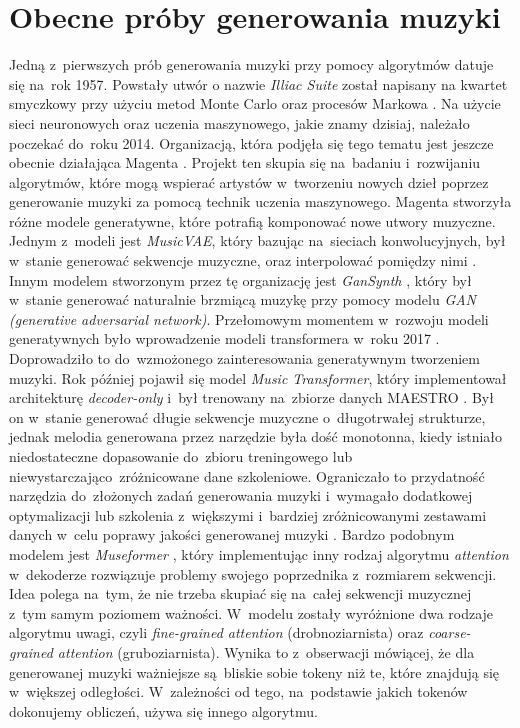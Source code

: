 \documentclass[data-science]{agh-wi} %
\begin{document}
\section{Obecne próby generowania muzyki}
Jedną z~pierwszych prób generowania muzyki przy pomocy algorytmów datuje się na~rok 1957. Powstały utwór o nazwie \textit{Illiac Suite} został napisany na kwartet smyczkowy przy użyciu metod Monte Carlo oraz procesów Markowa \cite*{komuter_gra}. Na użycie sieci neuronowych oraz uczenia maszynowego, jakie znamy dzisiaj, należało poczekać do~roku 2014. Organizacją, która podjęła się tego tematu jest jeszcze obecnie działająca Magenta \cite*{magenta}. Projekt ten skupia się na~badaniu i~rozwijaniu algorytmów, które mogą wspierać artystów w~tworzeniu nowych dzieł poprzez generowanie muzyki za pomocą technik uczenia maszynowego. Magenta stworzyła różne modele generatywne, które potrafią komponować nowe utwory muzyczne. Jednym z~modeli jest \textit{MusicVAE}, który bazując na~sieciach konwolucyjnych, był w~stanie generować sekwencje muzyczne, oraz interpolować pomiędzy nimi \cite*{musicvae}. Innym modelem stworzonym przez tę organizację jest \textit{GanSynth} \cite*{engel2018gansynth}, który był w~stanie generować naturalnie brzmiącą muzykę przy pomocy modelu \textit{GAN (generative adversarial network)}. Przełomowym momentem w~rozwoju modeli generatywnych było wprowadzenie modeli transformera w~roku 2017 \cite*{attention}. Doprowadziło to do~wzmożonego zainteresowania generatywnym tworzeniem muzyki. Rok później pojawił się model \textit{Music Transformer}, który implementował architekturę \textit{decoder-only} i~był trenowany na~zbiorze danych MAESTRO \cite*{huang2018music}. Był on w~stanie generować długie sekwencje muzyczne o~długotrwałej strukturze, jednak melodia generowana przez narzędzie była dość monotonna, kiedy istniało niedostateczne dopasowanie do~zbioru treningowego lub niewystarczająco~zróżnicowane dane szkoleniowe. Ograniczało to przydatność narzędzia do~złożonych zadań generowania muzyki i~wymagało dodatkowej optymalizacji lub szkolenia z~większymi i~bardziej zróżnicowanymi zestawami danych w~celu poprawy jakości generowanej muzyki \cite*{zhu2023survey}. Bardzo podobnym modelem jest \textit{Museformer} \cite*{yu2022museformer}, który implementując inny rodzaj algorytmu \textit{attention} w~dekoderze rozwiązuje problemy swojego poprzednika z~rozmiarem sekwencji. Idea polega na~tym, że nie trzeba skupiać się na~całej sekwencji muzycznej z~tym samym poziomem ważności. W~modelu zostały wyróżnione dwa rodzaje algorytmu uwagi, czyli \textit{fine-grained attention} (drobnoziarnista) oraz \textit{coarse-grained attention} (gruboziarnista). Wynika to z~obserwacji mówiącej, że dla generowanej muzyki ważniejsze są~bliskie sobie tokeny niż te, które znajdują się w~większej odległości. W~zależności od tego, na~podstawie jakich tokenów dokonujemy obliczeń, używa się innego algorytmu.
\end{document}
